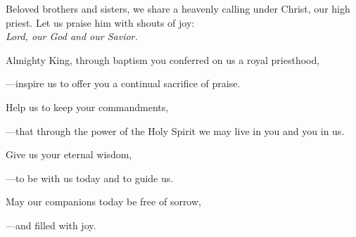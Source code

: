 \intercessions\indent

\begin{hangpar}

Beloved brothers and sisters, we share a heavenly calling under Christ, our high priest. Let us praise him with shouts of joy:\\
\emph{Lord, our God and our Savior.}

\medskip Almighty King, through baptism you conferred on us a royal priesthood,

{\color{red}---\thinspace}inspire us to offer you a continual sacrifice of praise.

\medskip Help us to keep your commandments,

{\color{red}---\thinspace}that through the power of the Holy Spirit we may live in you and you in us.

\medskip Give us your eternal wisdom,

{\color{red}---\thinspace}to be with us today and to guide us.

\medskip May our companions today be free of sorrow,

{\color{red}---\thinspace}and filled with joy.

\end{hangpar}

